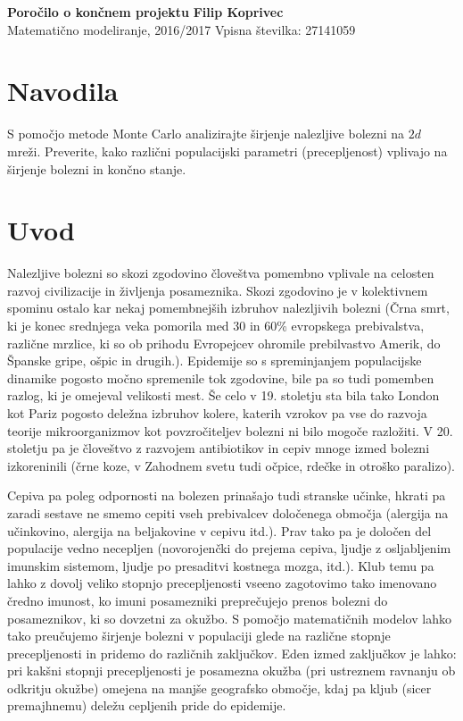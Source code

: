 \documentclass[a4paper, 11pt]{article}
\begin{document}
\noindent
\large\textbf{Poročilo o končnem projektu} \hfill \textbf{Filip Koprivec} \\
\normalsize Matematično modeliranje, 2016/2017 \hfill Vpisna številka: 27141059 \\


\section*{Navodila}
S pomočjo metode Monte Carlo analizirajte širjenje nalezljive bolezni na $2d$ mreži. Preverite, kako različni populacijski parametri (precepljenost) vplivajo na širjenje bolezni in končno stanje.

\section*{Uvod}
Nalezljive bolezni so skozi zgodovino človeštva pomembno vplivale na celosten razvoj civilizacije in življenja posameznika. Skozi zgodovino je v kolektivnem spominu ostalo kar nekaj pomembnejših izbruhov nalezljivih bolezni (Črna smrt, ki je konec srednjega veka pomorila med 30 in 60\% evropskega prebivalstva, različne mrzlice, ki so ob prihodu Evropejcev ohromile prebilvastvo Amerik, do Španske gripe, ošpic in drugih.). Epidemije so s spreminjanjem populacijske dinamike pogosto močno spremenile tok zgodovine, bile pa so tudi pomemben razlog, ki je omejeval velikosti mest. Še celo v 19. stoletju sta bila tako London kot Pariz pogosto deležna izbruhov kolere, katerih vzrokov pa vse do razvoja teorije mikroorganizmov kot povzročiteljev bolezni ni bilo mogoče razložiti. V 20. stoletju pa je človeštvo z razvojem antibiotikov in cepiv mnoge izmed bolezni izkoreninili (črne koze, v Zahodnem svetu tudi očpice, rdečke in otroško paralizo).

Cepiva pa poleg odpornosti na bolezen prinašajo tudi stranske učinke, hkrati pa zaradi sestave ne smemo cepiti vseh prebivalcev določenega območja (alergija na učinkovino, alergija na beljakovine v cepivu itd.). Prav tako pa je določen del populacije vedno necepljen (novorojenčki do prejema cepiva, ljudje z osljabljenim imunskim sistemom, ljudje po presaditvi kostnega mozga, itd.). Klub temu pa lahko z dovolj veliko stopnjo precepljenosti vseeno zagotovimo tako imenovano čredno imunost, ko imuni posamezniki preprečujejo prenos bolezni do posameznikov, ki so dovzetni za okužbo. S pomočjo matematičnih modelov lahko tako preučujemo širjenje bolezni v populaciji glede na različne stopnje precepljenosti in pridemo do različnih zaključkov. Eden izmed zaključkov je lahko: pri kakšni stopnji precepljenosti je posamezna okužba (pri ustreznem ravnanju ob odkritju okužbe) omejena na manjše geografsko območje, kdaj pa kljub (sicer premajhnemu) deležu cepljenih pride do epidemije.
\end{document}
